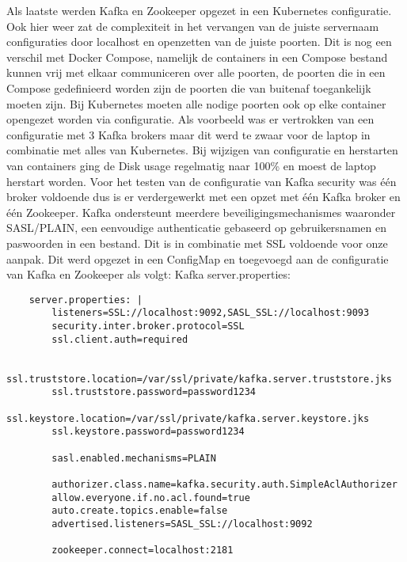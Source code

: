 Als laatste werden Kafka en Zookeeper opgezet in een Kubernetes configuratie. Ook hier weer zat de complexiteit in het vervangen van de juiste servernaam configuraties door localhost en openzetten van de juiste poorten.
Dit is nog een verschil met Docker Compose, namelijk de containers in een Compose bestand kunnen vrij met elkaar communiceren over alle poorten, de poorten die in een Compose gedefinieerd worden zijn de poorten die van buitenaf toegankelijk moeten zijn. Bij Kubernetes moeten alle nodige poorten ook op elke container opengezet worden via configuratie.
\newline
\newline
Als voorbeeld was er vertrokken van een configuratie met 3 Kafka brokers maar dit werd te zwaar voor de laptop in combinatie met alles van Kubernetes. Bij wijzigen van configuratie en herstarten van containers ging de Disk usage regelmatig naar 100\% en moest de laptop herstart worden. Voor het testen van de configuratie van Kafka security was \'e\'en broker voldoende dus is er verdergewerkt met een opzet met \'e\'en Kafka broker en \'e\'en Zookeeper. 
\newline
Kafka ondersteunt meerdere beveiligingsmechanismes waaronder SASL/PLAIN, een eenvoudige authenticatie gebaseerd op gebruikersnamen en paswoorden in een bestand. Dit is in combinatie met SSL voldoende voor onze aanpak.
\newline
Dit werd opgezet in een ConfigMap en toegevoegd aan de configuratie van Kafka en Zookeeper als volgt:
\newline
\newline
Kafka server.properties:
\begin{lstlisting}
    server.properties: |
        listeners=SSL://localhost:9092,SASL_SSL://localhost:9093
        security.inter.broker.protocol=SSL
        ssl.client.auth=required
    
        ssl.truststore.location=/var/ssl/private/kafka.server.truststore.jks
        ssl.truststore.password=password1234
        ssl.keystore.location=/var/ssl/private/kafka.server.keystore.jks
        ssl.keystore.password=password1234
    
        sasl.enabled.mechanisms=PLAIN
        
        authorizer.class.name=kafka.security.auth.SimpleAclAuthorizer
        allow.everyone.if.no.acl.found=true
        auto.create.topics.enable=false
        advertised.listeners=SASL_SSL://localhost:9092
        
        zookeeper.connect=localhost:2181
\end{lstlisting}

